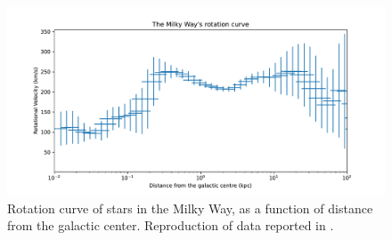 \begin{figure}[hbtp]
    \centering
    \includegraphics[width=\textwidth]{figures/RotationCurveMilkyWay.pdf}
    \caption{Rotation curve of stars in the Milky Way, as a function of distance from the galactic center. Reproduction of data reported in \cite{Sofue2020}.}
    \label{fig:MilkyWayRotationCurve}
\end{figure}

